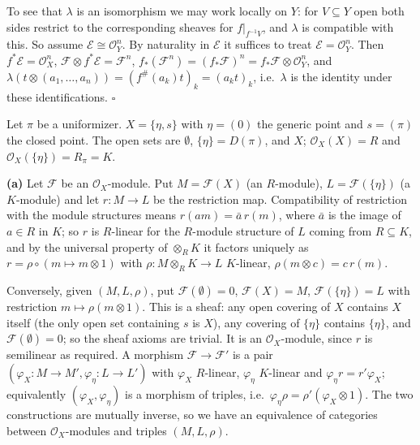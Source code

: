 \documentclass[11pt]{article}
\begin{document}
To see that $\lambda$ is an isomorphism we may work locally on $Y$: for $V\subseteq Y$ open both sides restrict to the corresponding sheaves for $f|_{f^{-1}V}$, and $\lambda$ is compatible with this. So assume $\mathcal E\cong\mathcal O_Y^n$. By naturality in $\mathcal E$ it suffices to treat $\mathcal E=\mathcal O_Y^n$. Then $f^*\mathcal E=\mathcal O_X^n$, $\mathcal F\otimes f^*\mathcal E=\mathcal F^n$, $f_*(\mathcal F^n)=(f_*\mathcal F)^n=f_*\mathcal F\otimes\mathcal O_Y^n$, and $\lambda(t\otimes(a_1,\dots,a_n))=(f^\#(a_k)t)_k=(a_kt)_k$, i.e.\ $\lambda$ is the identity under these identifications. \hfill$\square$

\pf
Let $\pi$ be a uniformizer. $X=\{\eta,s\}$ with $\eta=(0)$ the generic point and $s=(\pi)$ the closed point. The open sets are $\emptyset$, $\{\eta\}=D(\pi)$, and $X$; $\mathcal O_X(X)=R$ and $\mathcal O_X(\{\eta\})=R_\pi=K$.

\textbf{(a)} Let $\mathcal F$ be an $\mathcal O_X$-module. Put $M=\mathcal F(X)$ (an $R$-module), $L=\mathcal F(\{\eta\})$ (a $K$-module) and let $r:M\to L$ be the restriction map. Compatibility of restriction with the module structures means $r(am)=\bar a\,r(m)$, where $\bar a$ is the image of $a\in R$ in $K$; so $r$ is $R$-linear for the $R$-module structure of $L$ coming from $R\subseteq K$, and by the universal property of $\otimes_RK$ it factors uniquely as $r=\rho\circ(m\mapsto m\otimes1)$ with $\rho:M\otimes_RK\to L$ $K$-linear, $\rho(m\otimes c)=c\,r(m)$.

Conversely, given $(M,L,\rho)$, put $\mathcal F(\emptyset)=0$, $\mathcal F(X)=M$, $\mathcal F(\{\eta\})=L$ with restriction $m\mapsto\rho(m\otimes1)$. This is a sheaf: any open covering of $X$ contains $X$ itself (the only open set containing $s$ is $X$), any covering of $\{\eta\}$ contains $\{\eta\}$, and $\mathcal F(\emptyset)=0$; so the sheaf axioms are trivial. It is an $\mathcal O_X$-module, since $r$ is semilinear as required. A morphism $\mathcal F\to\mathcal F'$ is a pair $(\varphi_X:M\to M',\varphi_\eta:L\to L')$ with $\varphi_X$ $R$-linear, $\varphi_\eta$ $K$-linear and $\varphi_\eta r=r'\varphi_X$; equivalently $(\varphi_X,\varphi_\eta)$ is a morphism of triples, i.e.\ $\varphi_\eta\rho=\rho'(\varphi_X\otimes1)$. The two constructions are mutually inverse, so we have an equivalence of categories between $\mathcal O_X$-modules and triples $(M,L,\rho)$.
\end{document}
